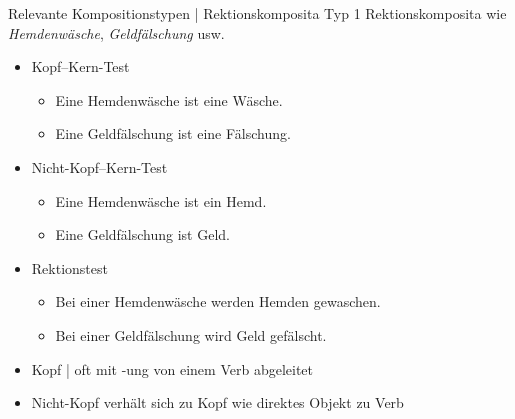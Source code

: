 \begin{frame}
  {Relevante Kompositionstypen | Rektionskomposita Typ 1}
  \onslide<+->
  Rektionskomposita wie \textit{Hemdenwäsche}, \textit{Geldfälschung} usw.
  \Halbzeile
  \begin{itemize}[<+->]
    \item Kopf--Kern-Test
      \begin{itemize}[<+->]
        \item Eine Hemdenwäsche ist eine Wäsche. \gruen{\Ck}
        \item Eine Geldfälschung ist eine Fälschung. \gruen{\Ck}
      \end{itemize}
    \item Nicht-Kopf--Kern-Test
      \begin{itemize}[<+->]
        \item Eine Hemdenwäsche ist ein Hemd. \rot{\Fl}
        \item Eine Geldfälschung ist Geld. \rot{\Fl}
      \end{itemize}
      \Halbzeile
    \item Rektionstest 
      \begin{itemize}[<+->]
        \item Bei einer Hemdenwäsche werden Hemden gewaschen. \gruen{\Ck}
        \item Bei einer Geldfälschung wird Geld gefälscht. \gruen{\Ck}
      \end{itemize}
      \Halbzeile
    \item Kopf | oft mit \alert{-ung} von einem Verb abgeleitet
    \item Nicht-Kopf verhält sich zu Kopf wie \alert{direktes Objekt} zu Verb
  \end{itemize}
\end{frame}


